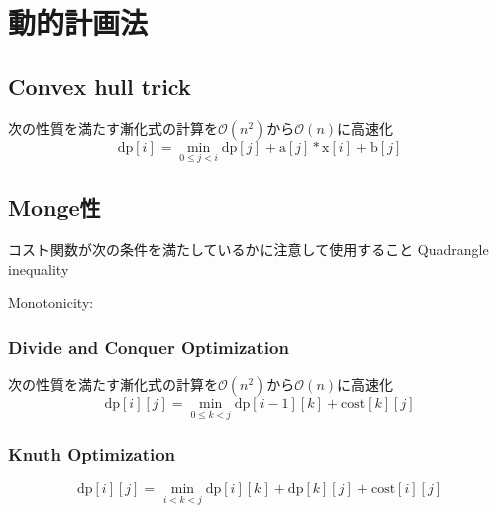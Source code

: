 \section{動的計画法}

\subsection{Convex hull trick}
次の性質を満たす漸化式の計算を$\mathcal{O}(n^2)$から$\mathcal{O}(n)$に高速化
\begin{equation}
\text{dp}[i]=\min_{0\le j<i}{\text{dp}[j]+\text{a}[j]*\text{x}[i]+\text{b}[j]} 
\end{equation}


\subsection{Monge性}
コスト関数が次の条件を満たしているかに注意して使用すること
Quadrangle inequality 

Monotonicity:

\subsubsection{Divide and Conquer Optimization}
次の性質を満たす漸化式の計算を$\mathcal{O}(n^2)$から$\mathcal{O}(n)$に高速化
\begin{equation}
\text{dp}[i][j] = \min_{0\le k<j}{\text{dp}[i-1][k]+\text{cost}[k][j]} 
\end{equation}



\subsubsection{Knuth Optimization}
\begin{equation}
\text{dp}[i][j] = \min_{i<k<j}{\text{dp}[i][k]+\text{dp}[k][j]}+\text{cost}[i][j]
\end{equation}

